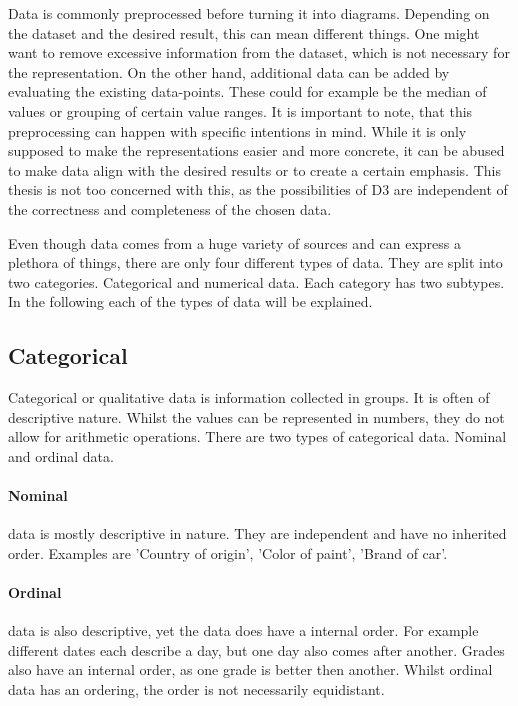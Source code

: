 Data is commonly preprocessed before turning it into diagrams. Depending on the dataset and the desired result, this can mean different things. One might want to remove excessive information from the dataset, which is not necessary for the representation. On the other hand, additional data can be added by evaluating the existing data-points. These could for example be the median of values or grouping of certain value ranges\cite{garcia2015data}. It is important to note, that this preprocessing can happen with specific intentions in mind. While it is only supposed to make the representations easier and more concrete, it can be abused to make data align with the desired results or to create a certain emphasis. This thesis is not too concerned with this, as the possibilities of D3 are independent of the correctness and completeness of the chosen data.

Even though data comes from a huge variety of sources and can express a plethora of things, there are only four different types of data\cite{henze_2021}. They are split into two categories. Categorical and numerical data. Each category has two subtypes. In the following each of the types of data will be explained.

\subsection{Categorical}

Categorical or qualitative data is information collected in groups. It is often of descriptive nature. Whilst the values can be represented in numbers, they do not allow for arithmetic operations.
There are two types of categorical data. Nominal and ordinal data.

\paragraph{Nominal}
data is mostly descriptive in nature. They are independent and have no inherited order. Examples are 'Country of origin', 'Color of paint', 'Brand of car'.

\paragraph{Ordinal}
data is also descriptive, yet the data does have a internal order. For example different dates each describe a day, but one day also comes after another. Grades also have an internal order, as one grade is better then another. Whilst ordinal data has an ordering, the order is not necessarily equidistant.

